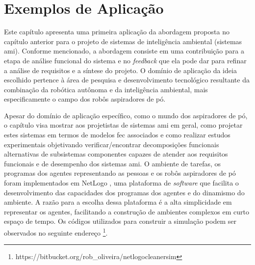 \chapter{Exemplos de Aplicação}
\label{cap:resultados}



Este capítulo apresenta uma primeira aplicação da abordagem proposta no capítulo anterior para o projeto de sistemas de inteligência ambiental (sistemas \acrshort{ami}). Conforme mencionado, a abordagem consiste em uma contribuição para a etapa de análise funcional do sistema e no \textit{feedback} que ela pode dar para refinar a análise de requisitos e a síntese do projeto. O domínio de aplicação da ideia escolhido pertence à área de pesquisa e desenvolvimento tecnológico resultante da combinação da robótica autônoma e da inteligência ambiental, mais especificamente o campo dos robôs aspiradores de pó.

Apesar do domínio de aplicação específico, como o mundo dos aspiradores de pó, o capítulo visa mostrar aos projetistas de sistemas \acrshort{ami} em geral, como projetar estes sistemas em termos de modelos \acrshort{fec} associados e como realizar estudos experimentais objetivando verificar/encontrar decomposições funcionais alternativas de subsistemas componentes capazes de atender aos requisitos funcionais e de desempenho dos sistemas \acrshort{ami}. O ambiente de tarefas, os programas dos agentes representando as pessoas e os robôs aspiradores de pó foram implementados em NetLogo \cite{wilensky1999netlogo}, uma plataforma de \textit{software} que facilita o desenvolvimento das capacidades dos programas dos agentes e do dinamismo do ambiente. A razão para a escolha dessa plataforma é a alta simplicidade em representar os agentes, facilitando a construção de ambientes complexos em curto espaço de tempo. Os códigos utilizados para construir a simulação podem ser observados no seguinte endereço \footnote{https://bitbucket.org/rob\_oliveira/netlogocleanersim}.

